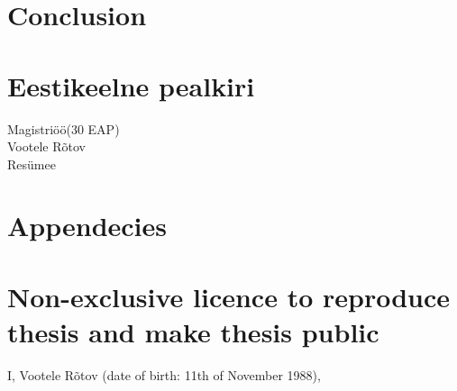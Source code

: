 \documentclass{style/master-thesis}
\begin{document}
\pagebreak


\clearpage
\section{Conclusion} 



\newpage


\section{Eestikeelne pealkiri}
Magistriöö(30 EAP) \\
Vootele Rõtov \\
Resümee \\




\newpage

{}


\newpage

\appendix
\section*{Appendecies}
\renewcommand{\thesubsection}{\Alph{subsection}}

\pagebreak
\section*{\small Non-exclusive licence to reproduce thesis and make thesis public}


I, Vootele Rõtov (date of birth: 11th of November 1988),
\end{document}
